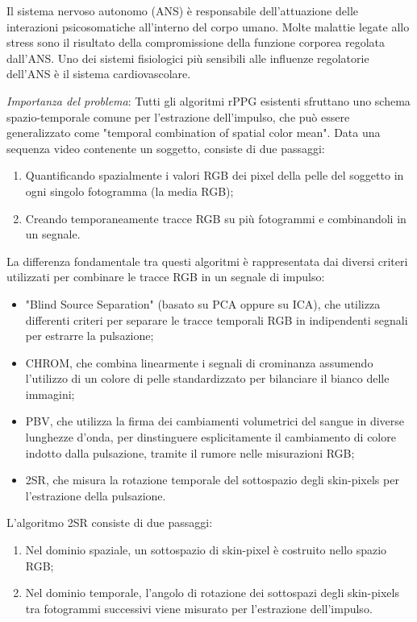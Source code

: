 \documentclass[journal,A4paper,compsoc,epsfig]{IEEEtran}
\begin{document}
    Il sistema nervoso autonomo (ANS) è responsabile dell'attuazione delle interazioni psicosomatiche all'interno del corpo umano.
    Molte malattie legate allo stress sono il risultato della compromissione della funzione corporea regolata dall'ANS.
    Uno dei sistemi fisiologici più sensibili alle influenze regolatorie dell'ANS è il sistema cardiovascolare.

    \emph{Importanza del problema}:
      Tutti gli algoritmi rPPG esistenti sfruttano uno schema spazio-temporale comune per l'estrazione dell'impulso, che può essere generalizzato come "temporal combination of spatial color mean".
      Data una sequenza video contenente un soggetto, consiste di due passaggi:
      \begin{enumerate}
        \item Quantificando spazialmente i valori RGB dei pixel della pelle del soggetto in ogni singolo fotogramma (la media RGB);
        \item Creando temporaneamente tracce RGB su più fotogrammi e combinandoli in un segnale.
      \end{enumerate}
      La differenza fondamentale tra questi algoritmi è rappresentata dai diversi criteri utilizzati per combinare le tracce RGB in un segnale di impulso:
      \begin{itemize}
        \item "Blind Source Separation" (basato su PCA oppure su ICA), che utilizza differenti criteri per separare le tracce temporali RGB in indipendenti segnali per estrarre la pulsazione;
        \item CHROM, che combina linearmente i segnali di crominanza assumendo l'utilizzo di un colore di pelle standardizzato per bilanciare il bianco delle immagini;
        \item PBV, che utilizza la firma dei cambiamenti volumetrici del sangue in diverse lunghezze d'onda, per dinstinguere esplicitamente il cambiamento di colore indotto dalla pulsazione, tramite il rumore nelle misurazioni RGB;
        \item 2SR, che misura la rotazione temporale del sottospazio degli skin-pixels per l'estrazione della pulsazione.
      \end{itemize}
      L'algoritmo 2SR consiste di due passaggi:
      \begin{enumerate}
        \item Nel dominio spaziale, un sottospazio di skin-pixel è costruito nello spazio RGB;
        \item Nel dominio temporale, l'angolo di rotazione dei sottospazi degli skin-pixels tra fotogrammi successivi viene misurato per l'estrazione dell'impulso.
      \end{enumerate}
\end{document}
